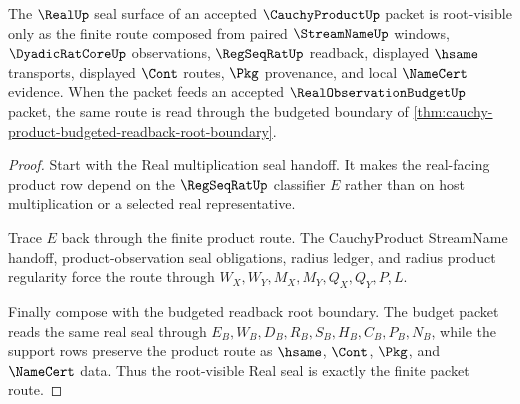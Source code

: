 \begin{theorem}
\label{thm:cauchy-product-real-seal-root-unblock-surface}
The $\RealUp$ seal surface of an accepted $\CauchyProductUp$ packet is root-visible only as the finite route composed from paired $\StreamNameUp$ windows, $\DyadicRatCoreUp$ observations, $\RegSeqRatUp$ readback, displayed $\hsame$ transports, displayed $\Cont$ routes, $\Pkg$ provenance, and local $\NameCert$ evidence. When the packet feeds an accepted $\RealObservationBudgetUp$ packet, the same route is read through the budgeted boundary of \autoref{thm:cauchy-product-budgeted-readback-root-boundary}.
\end{theorem}
\begin{proof}
Start with the Real multiplication seal handoff. It makes the real-facing product row depend on the $\RegSeqRatUp$ classifier $E$ rather than on host multiplication or a selected real representative.

Trace $E$ back through the finite product route. The CauchyProduct StreamName handoff, product-observation seal obligations, radius ledger, and radius product regularity force the route through $W_X,W_Y,M_X,M_Y,Q_X,Q_Y,P,L$.

Finally compose with the budgeted readback root boundary. The budget packet reads the same real seal through $E_B,W_B,D_B,R_B,S_B,H_B,C_B,P_B,N_B$, while the support rows preserve the product route as $\hsame$, $\Cont$, $\Pkg$, and $\NameCert$ data. Thus the root-visible Real seal is exactly the finite packet route.
\end{proof}

